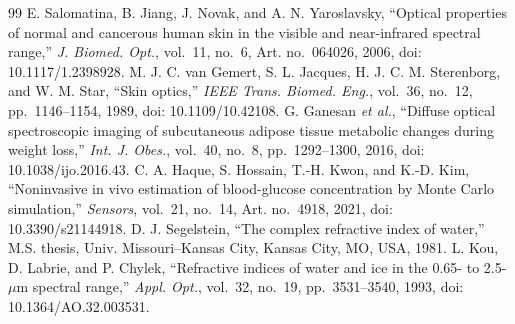\documentclass[10pt]{article}
\begin{document}
\begin{thebibliography}{99}
 E. Salomatina, B. Jiang, J. Novak, and A. N. Yaroslavsky, ``Optical properties of normal and cancerous human skin in the visible and near-infrared spectral range,'' \emph{J. Biomed. Opt.}, vol.~11, no.~6, Art. no.~064026, 2006, doi: 10.1117/1.2398928.
 M. J. C. van Gemert, S. L. Jacques, H. J. C. M. Sterenborg, and W. M. Star, ``Skin optics,'' \emph{IEEE Trans. Biomed. Eng.}, vol.~36, no.~12, pp.~1146--1154, 1989, doi: 10.1109/10.42108.
 G. Ganesan \emph{et al.}, ``Diffuse optical spectroscopic imaging of subcutaneous adipose tissue metabolic changes during weight loss,'' \emph{Int. J. Obes.}, vol.~40, no.~8, pp.~1292--1300, 2016, doi: 10.1038/ijo.2016.43.
 C. A. Haque, S. Hossain, T.-H. Kwon, and K.-D. Kim, ``Noninvasive in vivo estimation of blood-glucose concentration by Monte Carlo simulation,'' \emph{Sensors}, vol.~21, no.~14, Art. no.~4918, 2021, doi: 10.3390/s21144918.
 D. J. Segelstein, ``The complex refractive index of water,'' M.S. thesis, Univ. Missouri--Kansas City, Kansas City, MO, USA, 1981.
 L. Kou, D. Labrie, and P. Chylek, ``Refractive indices of water and ice in the 0.65- to 2.5-$\mu$m spectral range,'' \emph{Appl. Opt.}, vol.~32, no.~19, pp.~3531--3540, 1993, doi: 10.1364/AO.32.003531.
\end{thebibliography}
\end{document}
